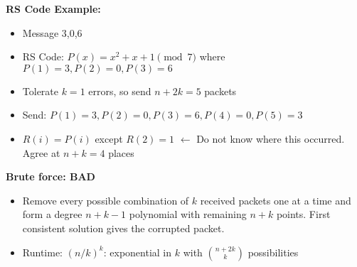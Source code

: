 \documentclass{article}\usepackage{amsmath,amssymb,amsthm,tikz,tkz-graph,color,chngpage,soul,hyperref,csquotes,graphicx,floatrow}\newcommand*{\QEDB}{\hfill\ensuremath{\square}}\newtheorem*{prop}{Proposition}\renewcommand{\theenumi}{\alph{enumi}}\usepackage[shortlabels]{enumitem}\usepackage[nobreak=true]{mdframed}\usetikzlibrary{matrix,calc}\MakeOuterQuote{"}\usepackage[margin=0.75in]{geometry} \newtheorem{theorem}{Theorem}
\begin{document}
\begin{mdframed}
\textbf{RS Code Example:}
\begin{itemize}
\item Message 3,0,6
\item RS Code: $P(x) = x^2 + x + 1 \pmod{7}$ where $P(1) = 3, P(2) = 0, P(3) = 6$
\item Tolerate $k = 1$ errors, so send $n+2k = 5$ packets
\item Send: $P(1) = 3, P(2) = 0, P(3) = 6, P(4) = 0, P(5) = 3$
\item $R(i) = P(i)$ except $R(2) = 1$ $\leftarrow$ Do not know where this occurred. Agree at $n+k = 4$ places
\end{itemize}
\end{mdframed}
\begin{mdframed}
\textbf{Brute force: BAD}
\begin{itemize}
\item Remove every possible combination of $k$ received packets one at a time and form a degree $n+k-1$ polynomial with remaining $n+k$ points. First consistent solution gives the corrupted packet.
\item Runtime: $(n/k)^k$: exponential in $k$ with $\binom{n+2k}{k}$ possibilities
\end{itemize}
\end{mdframed}
\end{document}
